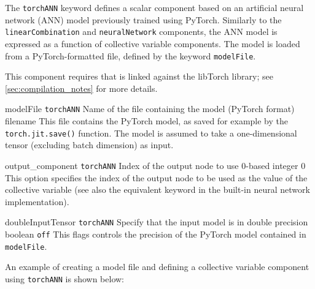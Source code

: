 
The \texttt{torchANN} keyword defines a scalar component based on an artificial neural network (ANN) model previously trained using PyTorch. Similarly to the \texttt{linearCombination} and \texttt{neuralNetwork} components, the ANN model is expressed as a function of collective variable components. The model is loaded from a PyTorch-formatted file, defined by the keyword \texttt{modelFile}.

This component requires that \MDENGINE{} is linked against the libTorch library; see \ref{sec:compilation_notes} for more details.

\begin{cvcoptions}

\item %
  \key
    {modelFile}{%
    \texttt{torchANN}}{%
    Name of the file containing the model (PyTorch format)}{%
    filename}{%
    This file contains the PyTorch model, as saved for example by the \texttt{torch.jit.save()} function.
    The model is assumed to take a one-dimensional tensor (excluding batch dimension) as input.
  }

\item %
  \keydef
    {output\_component}{%
    \texttt{torchANN}}{%
    Index of the output node to use}{%
    0-based integer}{%
    0}{%
    This option specifies the index of the output node to be used as the value of the collective variable (see also the equivalent keyword  in the built-in neural network implementation).
  }

\item %
  \keydef
    {doubleInputTensor}{%
    \texttt{torchANN}}{%
    Specify that the input model is in double precision}{%
    boolean}{%
    \texttt{off}}{%
    This flags controls the precision of the PyTorch model contained in \texttt{modelFile}.
  }

\end{cvcoptions}

An example of creating a model file and defining a collective variable component using \texttt{torchANN} is shown below:

